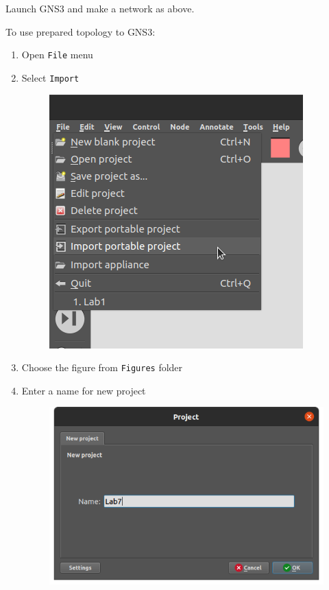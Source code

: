 \documentclass{../UTNetLab}
\begin{document}
Launch GNS3 and make a network as above.

To use prepared topology to GNS3:
\begin{enumerate}
    \item Open \texttt{File} menu
    \item Select \texttt{Import }
          \begin{figure}[H]
              \centering
              \includegraphics[scale=1.6]{img/import-1}
          \end{figure}
    \item Choose the figure from \texttt{Figures} folder
    \item Enter a name for new project
          \begin{figure}[H]
              \centering
              \includegraphics[scale=1.6]{img/import-2}
          \end{figure}
\end{enumerate}
\end{document}
